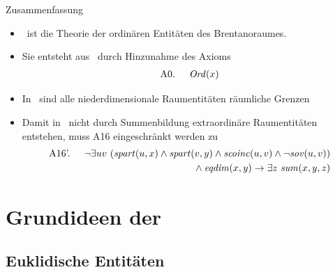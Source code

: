 \documentclass[10pt,xcolor={dvipsnames}]{beamer}
\begin{document}
\begin{frame}{\bso}{Zusammenfassung}
    \begin{itemize}
        \item 
            \bso\ ist die Theorie der ordinären Entitäten des Brentanoraumes.
        \item 
            Sie entsteht aus \bs\ durch Hinzunahme des Axioms
            \begin{align*}
                \text{A0. } \quad \mathit{Ord}(x)
            \end{align*}
        \item 
            In \bso\ sind alle niederdimensionale Raumentitäten räumliche Grenzen
        \item 
            Damit in \bso\ nicht durch Summenbildung extraordinäre Raumentitäten entstehen, muss A16 eingeschränkt werden zu
            \begin{align*}
                \text{A16'. }\quad  \neg \exists uv\ (\mathit{spart}(u,x) \wedge \mathit{spart}(v,y) \wedge \mathit{scoinc}(u,v) \wedge \neg \mathit{sov}(u,v))\\
                \mbox{}\wedge \mathit{eqdim}(x,y)
                \to \exists z\ \mathit{sum}(x,y,z)
            \end{align*}
    \end{itemize}
\end{frame}




\section{Grundideen der \strukt}
\subsection{Euklidische Entitäten}
\end{document}
